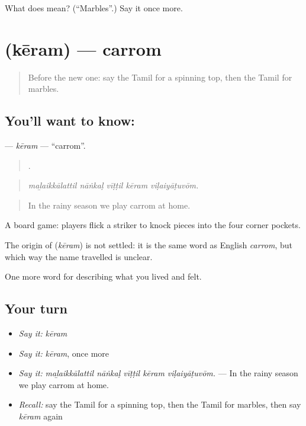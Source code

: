 \begin{tcolorbox}[breakable,colback=teal!4,colframe=teal!35!black,title={Before you move on}]
What does  mean? (\textquotedblleft{}Marbles\textquotedblright{}.) Say it once more.
\end{tcolorbox}
\section[\texorpdfstring{\ta{கேரம்} (kēram)}{கேரம் (kēram)}]{ (kēram) — carrom}

\label{lesson:TA-C530-keram}



\begin{quote}
Before the new one: say the Tamil for a spinning top, then the Tamil for marbles.
\end{quote}

\subsection*{You'll want to know: }
\textbf{} — \emph{kēram} — \textquotedblleft{}carrom\textquotedblright{}.

\begin{quote}
    .
\end{quote}

\begin{quote}
\emph{maḻaikkālattil nāṅkaḷ vīṭṭil kēram viḷaiyāṭuvōm.}
\end{quote}

\begin{quote}
In the rainy season we play carrom at home.
\end{quote}

A board game: players flick a striker to knock pieces into the four corner pockets.

\begin{cousinweb}
The origin of \textbf{} (\emph{kēram}) is not settled: it is the same word as English \emph{carrom}, but which way the name travelled is unclear.
\end{cousinweb}

\begin{grammarlens}[title={What you've built}]
One more word for describing what you lived and felt.
\end{grammarlens}

\subsection*{Your turn}
\begin{itemize}
\raggedright
  \item \emph{Say it:} \emph{kēram}
  \item \emph{Say it:} \emph{kēram}, once more
  \item \emph{Say it:} \emph{maḻaikkālattil nāṅkaḷ vīṭṭil kēram viḷaiyāṭuvōm.} — In the rainy season we play carrom at home.
  \item \emph{Recall:} say the Tamil for a spinning top, then the Tamil for marbles, then say \emph{kēram} again
\end{itemize}

